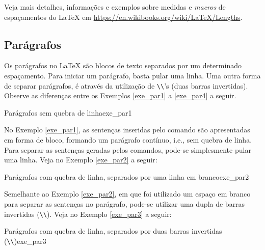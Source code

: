 \begin{marker}
Veja mais detalhes, informações e exemplos sobre medidas e \textit{macros} de espaçamentos do \LaTeX{} em \url{https://en.wikibooks.org/wiki/LaTeX/Lengths}.
\end{marker}

\subsection{Parágrafos}
\label{sec:paragrafos}

Os parágrafos no \LaTeX{} são blocos de texto separados por um determinado espaçamento. Para iniciar um parágrafo, basta pular uma linha. Uma outra forma de separar parágrafos, é através da utilização de {\tt \textbackslash\textbackslash}'s (duas barras invertidas). Observe as diferenças entre os Exemplos \ref{exe_par1} a \ref{exe_par4} a seguir.

\begin{texexptitled}[breakable,enhanced,middle=2mm]{Parágrafos sem quebra de linha}{exe_par1}
\lipsumsentence[1-4] 
\lipsumsentence[5-8]
\end{texexptitled}

No Exemplo \ref{exe_par1}, as sentenças inseridas pelo comando \texttt{\lipsumsentence} são apresentadas em forma de bloco, formando um parágrafo contínuo, i.e., sem quebra de linha. Para separar as sentenças geradas pelos comandos, pode-se simplesmente pular uma linha. Veja no Exemplo \ref{exe_par2} a seguir:

\begin{texexptitled}[breakable,enhanced,middle=2mm]{Parágrafos com quebra de linha, separados por uma linha em branco}{exe_par2}
\lipsumsentence[1-4]  

\lipsumsentence[5-8]
\end{texexptitled}

Semelhante ao Exemplo \ref{exe_par2}, em que foi utilizado um espaço em branco para separar as sentenças no parágrafo, pode-se utilizar uma dupla de barras invertidas ({\tt \textbackslash\textbackslash}). Veja no Exemplo \ref{exe_par3} a seguir:

\begin{texexptitled}[breakable,enhanced,middle=2mm]{Parágrafos com quebra de linha, separados por duas barras invertidas ({\tt \textbackslash\textbackslash})}{exe_par3}
\lipsumsentence[1-4] \\ 
\lipsumsentence[5-8]
\end{texexptitled}

